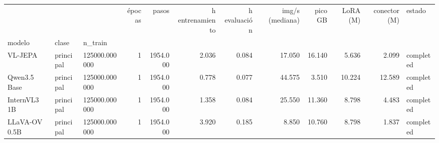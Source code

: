 \begin{tabular}{lllrrrrrrrrl}
\toprule
 &  &  & épocas & pasos & h entrenamiento & h evaluación & img/s (mediana) & pico GB & LoRA (M) & conector (M) & estado \\
modelo & clase & n\_train &  &  &  &  &  &  &  &  &  \\
\midrule
VL-JEPA & principal & 125000.000000 & 1 & 1954.000 & 2.036 & 0.084 & 17.050 & 16.140 & 5.636 & 2.099 & completed \\
\cline{1-12} \cline{2-12}
Qwen3.5 Base & principal & 125000.000000 & 1 & 1954.000 & 0.778 & 0.077 & 44.575 & 3.510 & 10.224 & 12.589 & completed \\
\cline{1-12} \cline{2-12}
InternVL3 1B & principal & 125000.000000 & 1 & 1954.000 & 1.358 & 0.084 & 25.550 & 11.360 & 8.798 & 4.483 & completed \\
\cline{1-12} \cline{2-12}
LLaVA-OV 0.5B & principal & 125000.000000 & 1 & 1954.000 & 3.920 & 0.185 & 8.850 & 10.760 & 8.798 & 1.837 & completed \\
\cline{1-12} \cline{2-12}
\bottomrule
\end{tabular}
